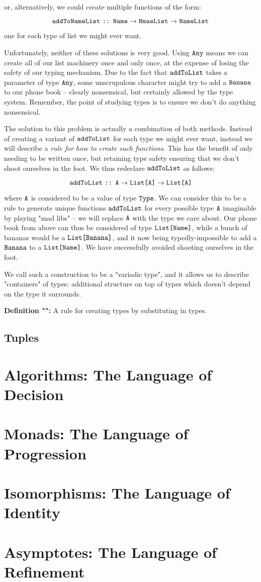 \documentclass[12pt]{book}
\newcommand{\type}[1]{\ensuremath{\text{\texttt{#1}}}}
\newcommand{\func}[1]{\ensuremath{\text{\texttt{#1}}}}
\newcommand{\typeof}{\ensuremath{\text{ \texttt{::} }}}
\newcommand{\what}{}
\newcommand{\defn}[2]{\renewcommand{\what}{#1}\textbf{Definition "\titlecap{#1}":} #2}
\begin{document}
or, alternatively, we could create multiple functions of the form:

$$ \func{addToNameList} \typeof \type{Name} \to \type{NmaeList} \to \type{NameList} $$

one for each type of list we might ever want.

Unfortunately, neither of these solutions is very good. Using \type{Any} means we can create all of our list
machinery once and only once, at the expense of losing the safety of our typing mechanism. Due to the
fact that \func{addToList} takes a parameter of type \type{Any}, some unscrupulous character might try to add a
\type{Banana} to our phone book -- clearly nonsensical, but certainly allowed by the type system. Remember, the point of
studying types is to ensure we don't do anything nonsensical.

The solution to this problem is actually a combination of both methods. Instead of creating a variant of
\func{addToList} for each type we might ever want, instead we will describe a \textit{rule for how to create such
functions}. This has the benefit of only needing to be written once, but retaining type safety ensuring that we don't
shoot ourselves in the foot. We thus redeclare \func{addToList} as follows:

$$ \func{addToList} \typeof \type{A} \to \type{List[A]} \to \type{List[A]} $$

where \type{A} is considered to be a value of type \type{Type}. We can consider this to be a rule to generate unique
functions \func{addToList} for every possible type \type{A} imaginable by playing "mad libs" -- we will replace \type{A}
with the type we care about. Our phone book from above can thus be considered of type \type{List[Name]}, while a bunch
of bananas would be a \type{List[Banana]}, and it now being typedly-impossible to add a \type{Banana} to a
\type{List[Name]}. We have successfully avoided shooting ourselves in the foot.

We call such a construction to be a "variadic type", and it allows us to describe "containers" of types: additional
structure on top of types which doesn't depend on the type it surrounds.

\defn{variadic type}{A rule for creating types by substituting in types.}


\section{Tuples}





\chapter{Algorithms: The Language of Decision}
\chapter{Monads: The Language of Progression}
\chapter{Isomorphisms: The Language of Identity}
\chapter{Asymptotes: The Language of Refinement}
\end{document}
